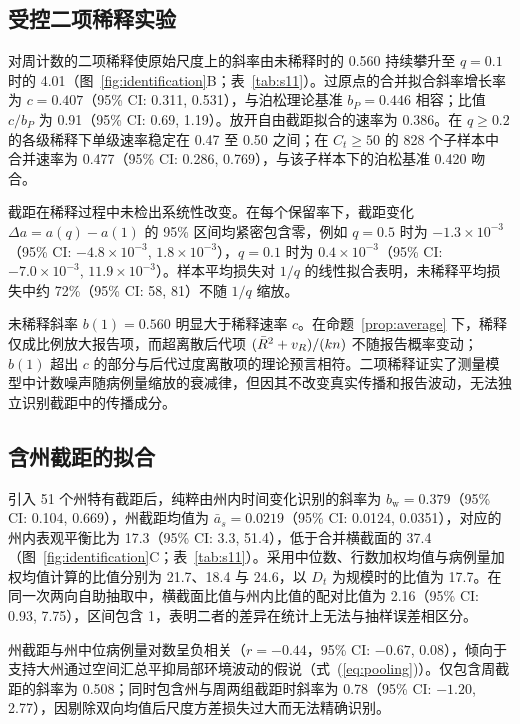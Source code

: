 \subsection{受控二项稀释实验}
\label{sec:res-thinning}

对周计数的二项稀释使原始尺度上的斜率由未稀释时的 0.560 持续攀升至 $q=0.1$ 时的 4.01（图~\ref{fig:identification}B；表~\ref{tab:s11}）。过原点的合并拟合斜率增长率为 $c=0.407$（95\% CI: 0.311, 0.531），与泊松理论基准 $b_P=0.446$ 相容；比值 $c/b_P$ 为 0.91（95\% CI: 0.69, 1.19）。放开自由截距拟合的速率为 0.386。在 $q\ge0.2$ 的各级稀释下单级速率稳定在 0.47 至 0.50 之间；在 $C_t\ge50$ 的 828 个子样本中合并速率为 0.477（95\% CI: 0.286, 0.769），与该子样本下的泊松基准 0.420 吻合。

截距在稀释过程中未检出系统性改变。在每个保留率下，截距变化 $\Delta a = a(q)-a(1)$ 的 95\% 区间均紧密包含零，例如 $q=0.5$ 时为 $-1.3\times10^{-3}$（95\% CI: $-4.8\times10^{-3}$, $1.8\times10^{-3}$），$q=0.1$ 时为 $0.4\times10^{-3}$（95\% CI: $-7.0\times10^{-3}$, $11.9\times10^{-3}$）。样本平均损失对 $1/q$ 的线性拟合表明，未稀释平均损失中约 72\%（95\% CI: 58, 81）不随 $1/q$ 缩放。

未稀释斜率 $b(1)=0.560$ 明显大于稀释速率 $c$。在命题~\ref{prop:average} 下，稀释仅成比例放大报告项，而超离散后代项 $(\bar{R}^2+v_R)/(kn)$ 不随报告概率变动；$b(1)$ 超出 $c$ 的部分与后代过度离散项的理论预言相符。二项稀释证实了测量模型中计数噪声随病例量缩放的衰减律，但因其不改变真实传播和报告波动，无法独立识别截距中的传播成分。

\subsection{含州截距的拟合}
\label{sec:res-fe}

引入 51 个州特有截距后，纯粹由州内时间变化识别的斜率为 $b_{\mathrm{w}}=0.379$（95\% CI: 0.104, 0.669），州截距均值为 $\bar{a}_s=0.0219$（95\% CI: 0.0124, 0.0351），对应的州内表观平衡比为 17.3（95\% CI: 3.3, 51.4），低于合并横截面的 37.4（图~\ref{fig:identification}C；表~\ref{tab:s11}）。采用中位数、行数加权均值与病例量加权均值计算的比值分别为 21.7、18.4 与 24.6，以 $D_t$ 为规模时的比值为 17.7。在同一次两向自助抽取中，横截面比值与州内比值的配对比值为 2.16（95\% CI: 0.93, 7.75），区间包含 1，表明二者的差异在统计上无法与抽样误差相区分。

州截距与州中位病例量对数呈负相关（$r=-0.44$，95\% CI: $-0.67$, 0.08），倾向于支持大州通过空间汇总平抑局部环境波动的假说（式~(\ref{eq:pooling})）。仅包含周截距的斜率为 0.508；同时包含州与周两组截距时斜率为 0.78（95\% CI: $-1.20$, 2.77），因剔除双向均值后尺度方差损失过大而无法精确识别。

